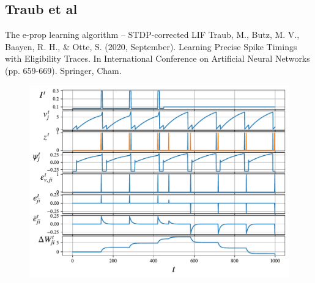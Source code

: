 \documentclass[t]{beamer}
\begin{document}
\subsection{Traub et al}
\begin{frame}{The e-prop learning algorithm -- STDP-corrected LIF}
\tiny{
Traub, M., Butz, M. V., Baayen, R. H., \& Otte, S. (2020, September). Learning Precise Spike Timings with Eligibility Traces. In International Conference on Artificial Neural Networks (pp. 659-669). Springer, Cham.}

	\begin{figure}[!ht]
		\includegraphics[width=0.78\linewidth]{demo_traub_lif.pdf}
	\end{figure}
	
\end{frame}
\end{document}
